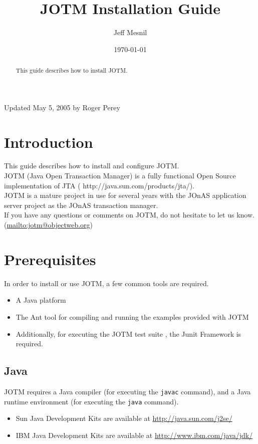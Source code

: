 \documentclass[a4paper,11pt]{article}
\title{JOTM Installation Guide}
\author{Jeff Mesnil}
\date{\today}
\begin{document}
\maketitle

\begin{abstract}
  This guide describes how to install JOTM.
\end{abstract}

\noindent Updated May 5, 2005 by Roger Perey

\tableofcontents

\section{Introduction}
\label{sec:intro}
This guide describes how to install and configure JOTM.\\
JOTM (Java Open Transaction Manager) is a fully functional
Open Source implementation of JTA
( {http://java.sun.com/products/jta/}).\\
JOTM is a mature
project in use for several years with the JOnAS
application server project as the JOnAS transaction
manager. \\

\noindent If you have any questions or comments on JOTM, do not
hesitate to let us know. (\url{mailto:jotm@objectweb.org})
\section{Prerequisites}
\label{sec:prereq}
In order to install or use JOTM, a few common tools are required.

\begin{itemize}
\item A Java platform
\item The Ant tool for compiling and running the examples
  provided with JOTM
\item Additionally, for executing the JOTM test suite
  , the Junit Framework is required.
\end{itemize}
\subsection{Java}
\label{sec:java_prereq}
JOTM requires a Java compiler (for executing the \texttt{javac} command),
 and a Java runtime environment (for executing the \texttt{java} command).
\begin{itemize}
\item Sun Java Development Kits are available at \url{http://java.sun.com/j2se/}
\item IBM Java Development Kits are available at \url{http://www.ibm.com/java/jdk/}
\end{itemize}
\end{document}
